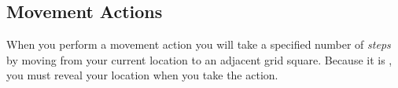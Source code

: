 \subsection*{Movement Actions}
When you perform a movement action you will take a specified number of \emph{steps} by moving from your current location to an adjacent grid square.  Because it is \LOUD{}, you must reveal your location when you take the \MMMOVE{} action.
